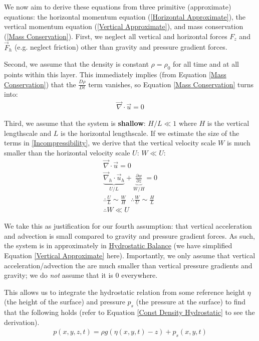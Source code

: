 We now aim to derive these equations from three primitive (approximate) equations: the horizontal momentum equation (\ref{Horizontal Approximate}), the vertical momentum equation (\ref{Vertical Approximate}), and mass conservation (\ref{Mass Conservation}). First, we neglect all vertical and horizontal forces \(F_z\) and \(\vec{F}_h\) (e.g. neglect friction) other than gravity and pressure gradient forces.

Second, we assume that the density is constant \(\rho=\rho_0\) for all time and at all points within this layer. This immediately implies (from Equation \ref{Mass Conservation}) that the \(\frac{D\rho}{Dt}\) term vanishes, so Equation \ref{Mass Conservation} turns into:
\begin{align}
    \label{Incompressibility}
    \vec{\nabla}\cdot\vec{u}=0
\end{align}

Third, we assume that the system is \textbf{shallow}: \(H/L\ll 1\) where \(H\) is the vertical lengthscale and \(L\) is the horizontal lengthscale. If we estimate the size of the terms in \ref{Incompressibility}, we derive that the vertical velocity scale \(W\) is much smaller than the horizontal velocity scale \(U\): \(W\ll U\):
\begin{align*}
    \vec{\nabla}\cdot\vec{u}=0\\
    \underbrace{\vec{\nabla}_h\cdot\vec{u}_h}_{U/L}+\underbrace{\frac{\partial w}{\partial z}}_{W/H}=0\\
    \therefore \frac{U}{L}\sim\frac{W}{H}\text{   }\therefore
    \frac{W}{U}\sim\frac{H}{L}\\
    \therefore \boxed{W \ll U}
\end{align*}

We take this as justification for our fourth assumption: that vertical acceleration and advection is small compared to gravity and pressure gradient forces. As such, the system is in approximately in \hyperref[Hydrostatic GFD]{Hydrostatic Balance} (we have simplified Equation \ref{Vertical Approximate} here). Importantly, we only assume that vertical acceleration/advection the  are much smaller than vertical pressure gradients and gravity; we do \textit{not} assume that it is \(0\) everywhere.

This allows us to integrate the hydrostatic relation from some reference height \(\eta\) (the height of the surface) and pressure \(p_s\) (the pressure at the surface) to find that the following holds (refer to Equation \ref{Const Density Hydrostatic} to see the derivation).
\begin{align*}
    p(x,y,z,t)=\rho g(\eta(x,y,t)-z)+p_s(x,y,t)
\end{align*}

